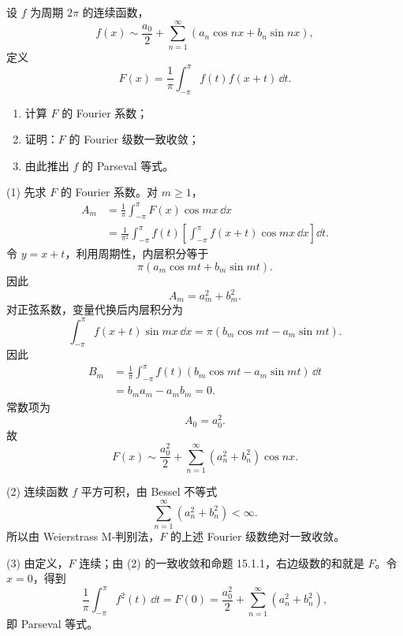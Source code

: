 \begin{xreferenceproblem}[4]
设 $f$ 为周期 $2\pi$ 的连续函数，
  \[
    f(x)\sim\frac{a_0}{2}+\sum_{n=1}^{\infty}(a_n\cos nx+b_n\sin nx),
  \]
  定义
  \[
    F(x)=\frac1\pi\int_{-\pi}^{\pi}f(t)f(x+t)\,\dd t.
  \]
  \begin{enumerate}[label=(\arabic*)]
    \item 计算 $F$ 的 Fourier 系数；
    \item 证明：$F$ 的 Fourier 级数一致收敛；
    \item 由此推出 $f$ 的 Parseval 等式。
  \end{enumerate}
\end{xreferenceproblem}
\begin{xsolution}
(1) 先求 $F$ 的 Fourier 系数。对 $m\ge1$，
\begin{align*}
  A_m
  &=\frac1\pi\int_{-\pi}^{\pi}F(x)\cos mx\,\dd x\\
  &=\frac1{\pi^2}\int_{-\pi}^{\pi}f(t)
    \left[\int_{-\pi}^{\pi}f(x+t)\cos mx\,\dd x\right]\dd t.
\end{align*}
令 $y=x+t$，利用周期性，内层积分等于
\[
  \pi(a_m\cos mt+b_m\sin mt).
\]
因此
\[
  A_m=a_m^2+b_m^2.
\]
对正弦系数，变量代换后内层积分为
\[
  \int_{-\pi}^{\pi}f(x+t)\sin mx\,\dd x
  =\pi(b_m\cos mt-a_m\sin mt).
\]
因此
\begin{align*}
  B_m
  &=\frac1\pi\int_{-\pi}^{\pi}
    f(t)(b_m\cos mt-a_m\sin mt)\,\dd t\\
  &=b_ma_m-a_mb_m=0.
\end{align*}
常数项为
\[
  A_0=a_0^2.
\]
故
\[
  \boxed{\displaystyle
  F(x)\sim\frac{a_0^2}{2}
  +\sum_{n=1}^{\infty}(a_n^2+b_n^2)\cos nx }.
\]

(2) 连续函数 $f$ 平方可积，由 Bessel 不等式
\[
  \sum_{n=1}^{\infty}(a_n^2+b_n^2)<\infty.
\]
所以由 Weierstrass M-判别法，$F$ 的上述 Fourier 级数绝对一致收敛。

(3) 由定义，$F$ 连续；由 (2) 的一致收敛和命题 15.1.1，右边级数的和就是 $F$。令 $x=0$，得到
\[
  \frac1\pi\int_{-\pi}^{\pi}f^2(t)\,\dd t
  =F(0)=\frac{a_0^2}{2}+\sum_{n=1}^{\infty}(a_n^2+b_n^2),
\]
即 Parseval 等式。
\end{xsolution}


